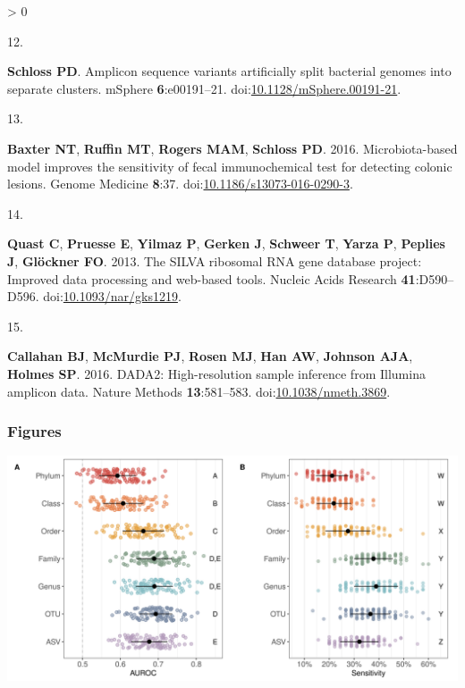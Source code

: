 \documentclass[
]{article}
\newlength{\cslhangindent}
\newlength{\csllabelwidth}
\newenvironment{CSLReferences}[2] %
 {%
  \setlength{\parindent}{0pt}
  \ifodd #1 \everypar{\setlength{\hangindent}{\cslhangindent}}\ignorespaces\fi
  \ifnum #2 > 0
  \setlength{\parskip}{#2\baselineskip}
  \fi
 }%
 {}
\newcommand{\CSLLeftMargin}[1]{\parbox[t]{\csllabelwidth}{#1}}
\newcommand{\CSLRightInline}[1]{\parbox[t]{\linewidth - \csllabelwidth}{#1}\break}
\begin{document}
\begin{CSLReferences}{0}{0}
\leavevmode\hypertarget{ref-schloss}{}%
\CSLLeftMargin{12. }
\CSLRightInline{\textbf{Schloss PD}. Amplicon sequence variants
artificially split bacterial genomes into separate clusters. mSphere
\textbf{6}:e00191--21.
doi:\href{https://doi.org/10.1128/mSphere.00191-21}{10.1128/mSphere.00191-21}.}

\leavevmode\hypertarget{ref-baxter2016}{}%
\CSLLeftMargin{13. }
\CSLRightInline{\textbf{Baxter NT}, \textbf{Ruffin MT}, \textbf{Rogers
MAM}, \textbf{Schloss PD}. 2016. Microbiota-based model improves the
sensitivity of fecal immunochemical test for detecting colonic lesions.
Genome Medicine \textbf{8}:37.
doi:\href{https://doi.org/10.1186/s13073-016-0290-3}{10.1186/s13073-016-0290-3}.}

\leavevmode\hypertarget{ref-quast2013}{}%
\CSLLeftMargin{14. }
\CSLRightInline{\textbf{Quast C}, \textbf{Pruesse E}, \textbf{Yilmaz P},
\textbf{Gerken J}, \textbf{Schweer T}, \textbf{Yarza P}, \textbf{Peplies
J}, \textbf{Glöckner FO}. 2013. The SILVA ribosomal RNA gene database
project: Improved data processing and web-based tools. Nucleic Acids
Research \textbf{41}:D590--D596.
doi:\href{https://doi.org/10.1093/nar/gks1219}{10.1093/nar/gks1219}.}

\leavevmode\hypertarget{ref-callahan2016}{}%
\CSLLeftMargin{15. }
\CSLRightInline{\textbf{Callahan BJ}, \textbf{McMurdie PJ},
\textbf{Rosen MJ}, \textbf{Han AW}, \textbf{Johnson AJA}, \textbf{Holmes
SP}. 2016. DADA2: High-resolution sample inference from Illumina
amplicon data. Nature Methods \textbf{13}:581--583.
doi:\href{https://doi.org/10.1038/nmeth.3869}{10.1038/nmeth.3869}.}

\end{CSLReferences}

\newpage

\hypertarget{figures}{%
\subsubsection{Figures}\label{figures}}

\includegraphics{figure_1.png}
\end{document}
